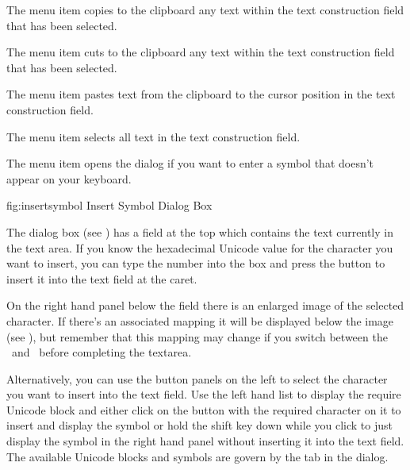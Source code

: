 The  menu item copies to the clipboard any text within 
the text construction field that has been selected.


The  menu item cuts to the clipboard any text within 
the text construction field that has been selected.


The  menu item pastes text from the
clipboard to the cursor position in the text construction field.


The  menu item selects all text in 
the text construction field.


The  menu item 
opens the  dialog  if you want to
enter a symbol that doesn't appear on your keyboard. 


\FloatFig
  {fig:insertsymbol}
  {}
  {Insert Symbol Dialog Box}

The  dialog box (see )
has a field at the top which contains the text currently in the text
area. If you know the hexadecimal Unicode value for the character
you want to insert, you can type the number into the
 box and press the
  button to
insert it into the text field at the caret. 

On the right hand panel below the  field
there is an enlarged image of the selected character. If there's an
associated mapping it will be displayed below the image
(see ), but remember that this mapping
may change if you switch between the \texttool\ and \mathstool\ before
completing the \gls{textarea}.

Alternatively, you can use the button panels on the left to
select the character you want to insert into the text field. Use the
left hand list to display the require Unicode block and either click
on the button with the required character on it to insert and
display the symbol or hold the shift key down while you click to
just display the symbol in the right hand panel without inserting it
into the text field. The available Unicode blocks and symbols are govern by the
 tab in the  dialog.

